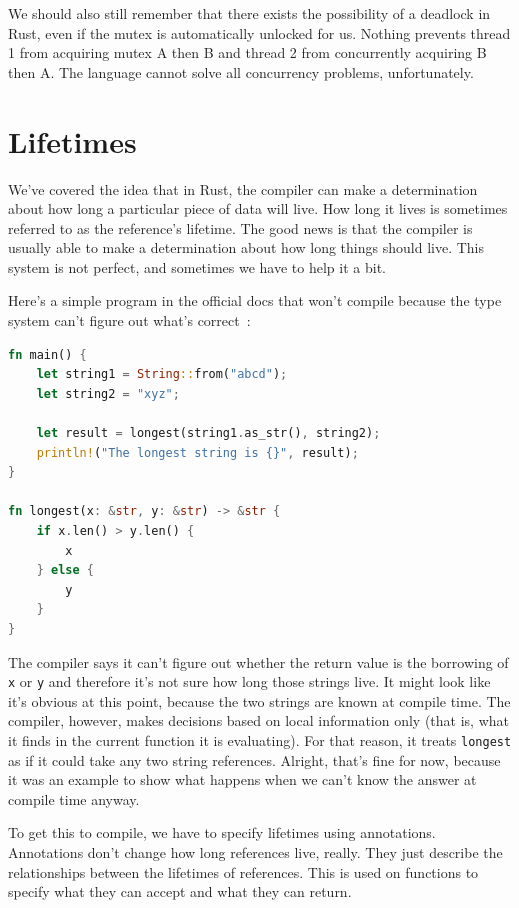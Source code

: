 \documentclass[a4paper]{report}
\begin{document}
We should also still remember that there exists the possibility of a deadlock in Rust, even if the mutex is automatically unlocked for us. Nothing prevents thread 1 from acquiring mutex A then B and thread 2 from concurrently acquiring B then A. The language cannot solve all concurrency problems, unfortunately.

\section*{Lifetimes}
We've covered the idea that in Rust, the compiler can make a determination about how long a particular piece of data will live. How long it lives is sometimes referred to as the reference's lifetime. The good news is that the compiler is usually able to make a determination about how long things should live. This system is not perfect, and sometimes we have to help it a bit.

Here's a simple program in the official docs that won't compile because the type system can't figure out what's correct~\cite{rustdocs}:

\begin{lstlisting}[language=Rust]
fn main() {
    let string1 = String::from("abcd");
    let string2 = "xyz";

    let result = longest(string1.as_str(), string2);
    println!("The longest string is {}", result);
}

fn longest(x: &str, y: &str) -> &str {
    if x.len() > y.len() {
        x
    } else {
        y
    }
}
\end{lstlisting}

The compiler says it can't figure out whether the return value is the borrowing of \texttt{x} or \texttt{y} and therefore it's not sure how long those strings live. It might look like it's obvious at this point, because the two strings are known at compile time. The compiler, however, makes decisions based on local information only (that is, what it finds in the current function it is evaluating). For that reason, it treats \texttt{longest} as if it could take any two string references. Alright, that's fine for now, because it was an example to show what happens when we can't know the answer at compile time anyway.

To get this to compile, we have to specify lifetimes using annotations. Annotations don't change how long references live, really. They just describe the relationships between the lifetimes of references. This is used on functions to specify what they can accept and what they can return.
\end{document}

